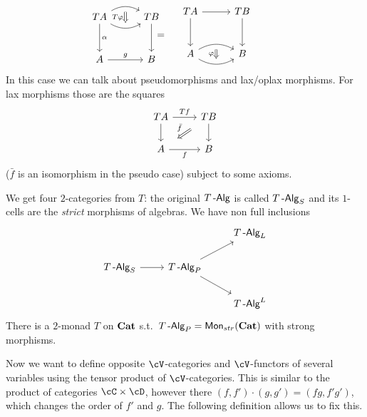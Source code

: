 \documentclass[a4paper,11pt,oneside,openany]{scrbook}
\begin{document}
\begin{exmp}
\begin{enumerate}
\[\begin{minipage}{0.3\linewidth}
\begin{tikzcd}[row sep=1cm, column sep=1cm]
           TA\arrow[d, "\alpha"] \arrow[r, bend right, ""{name=D, anchor=center}] \arrow[r, bend left, ""{name=U, anchor=center}] & TB \arrow[d] \\
 A\arrow[r, "g"]            &B      
      \ar[Rightarrow, shorten <= .3em, shorten >= .3em, "T\varphi"', from=U, to=D]
 \end{tikzcd}
    \end{minipage}
    \hspace{-1.3cm}
            =
	\hspace{.4cm}
	\begin{minipage}{0.3\linewidth}
		\begin{tikzcd}[row sep=1cm, column sep=1cm]
 TA\arrow[d] \arrow[r]                        &  TB\arrow[d] \\
 A\arrow[r, bend right, ""{name=D, anchor=center}] \arrow[r, bend left, ""{name=U, anchor=center}] &      B    
 \ar[Rightarrow, shorten <= .3em, shorten >= .3em, "\varphi"', from=U, to=D]
		\end{tikzcd}
	\end{minipage}
    \]
In this case we can talk about pseudomorphisms and lax/oplax morphisms. For lax morphisms those are the squares
	\[
	\begin{tikzcd}
	TA\arrow[d]\arrow["Tf"]{r}
	& TB\arrow[d] \arrow[dl, Rightarrow, shorten <= 1em, shorten >= 1em, "\bar{f}"']  \\
	A\arrow["f"']{r}
	& B
	\end{tikzcd}
	\]
($\bar{f}$ is an isomorphism in the pseudo case) subject to some axioms. 
\end{enumerate}
\end{exmp}
We get four $2$-categories from $T$: the original $T\operatorname{-\mathsf{Alg}}$ is called $T\operatorname{-\mathsf{Alg}}_S$ and its $1$-cells are the \emph{strict} morphisms of algebras. We have non full inclusions
\[
	\begin{tikzcd}
	&& T\Alg_L\\
	T\Alg_S \arrow[r]
	& T\Alg_P \arrow[ur]    \arrow[dr] \\
	&& T\Alg^L
	\end{tikzcd}
	\]
There is a $2$-monad $T$ on ${\normalfont\textbf{Cat}}$ s.t.\ $T\operatorname{-\mathsf{Alg}}_P=\operatorname{\mathsf{Mon}}_{str}({\normalfont\textbf{Cat}})$ with strong morphisms. 

Now we want to define opposite $\cV$-categories and $\cV$-functors of several variables using the tensor product of $\cV$-categories. This is similar to the product of categories $\cC\times\cD$, however there $(f,f')\cdot(g,g')=(fg,f'g')$, which changes the order of $f'$ and $g$. The following definition allows us to fix this.
\end{document}
